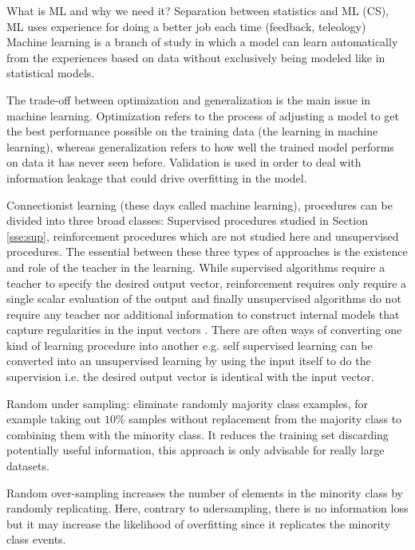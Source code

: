 \documentclass[11pt]{article}
\theoremstyle{definition}
\theoremstyle{remark}
\begin{document}
What is ML and why we need it? Separation between statistics and ML (CS), ML uses experience for doing a better job each time (feedback, teleology)
Machine learning is a branch of study in which a model can learn automatically from the experiences based on data without exclusively being modeled like in statistical models.

The trade-off between optimization and generalization is the main issue in machine learning. Optimization refers to the process of adjusting a model to get the best performance possible on the training data (the learning in machine learning), whereas generalization refers to how well the trained model performs on data it has never seen before.
Validation is used in order to deal with information leakage that could drive overfitting in the model.


Connectionist learning (these days called machine learning), procedures can be divided into three broad classes: Supervised procedures studied in Section \ref{sse:sup}, reinforcement procedures which are not studied here and unsupervised procedures.
The essential between these three types of approaches is the existence and role of the teacher in the learning.
While supervised algorithms require a teacher to specify the desired output vector, reinforcement requires only require a single scalar evaluation of the output and finally unsupervised algorithms do not require any teacher nor additional information to  construct internal models that capture regularities in the input vectors  \cite{hinton1990connectionist}. There are often ways of converting one kind of learning procedure into another e.g. self supervised learning can be converted into an unsupervised learning by using the input itself to do the supervision i.e. the desired output vector is identical with the input vector.

Random under sampling: eliminate randomly majority class examples, for example taking out $10\%$ samples without replacement from the majority class to combining them with the minority class. It reduces the training set discarding potentially useful information, this approach is only advisable for really large datasets.

Random over-sampling increases the number of elements in the minority class by randomly replicating. Here, contrary to udersampling, there is no information loss but it may increase the likelihood of overfitting since it replicates the minority class events.
\end{document}
